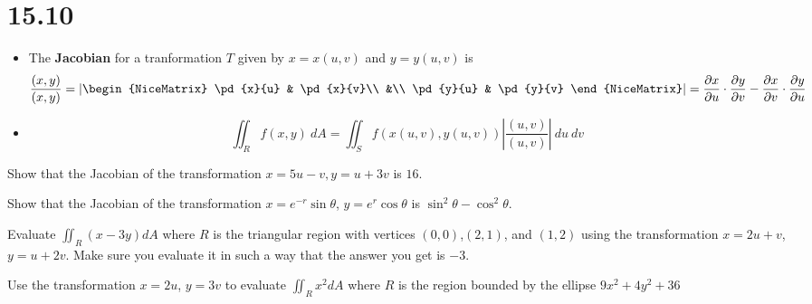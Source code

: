 \documentclass[12pt]{exam}
\newcommand{\qdate}{15.10} %
\begin{document}
\section*{\qdate}


\begin{info}
    \begin{itemize}
            \item The \textbf{Jacobian} for a tranformation \(T\) given by \(x=x(u,v)\) and \(y=y(u,v)\) is
            \[
                \dfrac{(x,y)}{(x,y)}=
                \left|\begin{NiceMatrix}
                    \pd{x}{u} & \pd{x}{v}\\
                        &\\
                    \pd{y}{u} & \pd{y}{v}
                \end{NiceMatrix}\right| = \pd{x}{u}\cdot\pd{y}{v}-\pd{x}{v}\cdot\pd{y}{u}
            \]
            \item 
            \[
                \iint_{R}f(x,y)~dA=\iint_{S}f(x(u,v),y(u,v))\left|\dfrac{(u,v)}{(u,v)}\right|~du~dv
            \]
    \end{itemize}
\end{info}


\begin{questions}

\question Show that the Jacobian of the transformation \(x=5u-v,y=u+3v\) is \(16\).
\ifprintanswers
        \begin{solution}
        \end{solution}
    \else
        \vfill
    \fi

\question Show that the Jacobian of the transformation \(x=e^{-r}\sin\theta\), \(y=e^r\cos\theta\) is \(\sin^2\theta-\cos^2\theta\).
\ifprintanswers
        \begin{solution}
        \end{solution}
    \else
        \vfill
    \fi

\newpage
\question Evaluate \(\iint_R(x-3y)dA\) where \(R\) is the triangular region with vertices \((0,0)\),\((2,1)\), and \((1,2)\) using the transformation \(x=2u+v\), \(y=u+2v\). Make sure you evaluate it in such a way that the answer you get is \(-3\).
\ifprintanswers
        \begin{solution}
        \end{solution}
    \else
        \vfill
    \fi

\question Use the transformation \(x=2u\), \(y=3v\) to evaluate \(\iint_R x^2 dA\) where \(R\) is the region bounded by the ellipse \(9x^2+4y^2+36\) 
\ifprintanswers
        \begin{solution}
        \end{solution}
    \else
        \vfill
    \fi

\end{questions}
\end{document}
